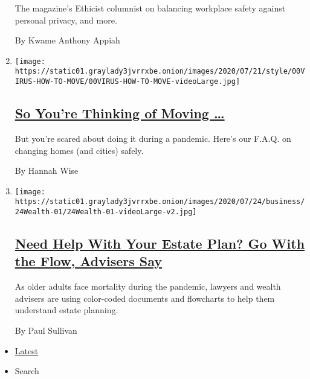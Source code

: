 \begin{enumerate}
  The magazine's Ethicist columnist on balancing workplace safety
  against personal privacy, and more.

  By Kwame Anthony Appiah
\item
  \texttt{[image: https://static01.graylady3jvrrxbe.onion/images/2020/07/21/style/00VIRUS-HOW-TO-MOVE/00VIRUS-HOW-TO-MOVE-videoLarge.jpg]}

  \hypertarget{so-youre-thinking-of-moving-}{%
  \subsection{\texorpdfstring{\href{/2020/07/24/style/moving-during-covid-coronavirus.html}{So
  You're Thinking of Moving
  \ldots{}}}{So You're Thinking of Moving \ldots{}}}\label{so-youre-thinking-of-moving-}}

  But you're scared about doing it during a pandemic. Here's our F.A.Q.
  on changing homes (and cities) safely.

  By Hannah Wise
\item
  \texttt{[image: https://static01.graylady3jvrrxbe.onion/images/2020/07/24/business/24Wealth-01/24Wealth-01-videoLarge-v2.jpg]}

  \hypertarget{need-help-with-your-estate-plan-go-with-the-flow-advisers-say}{%
  \subsection{\texorpdfstring{\href{/2020/07/24/your-money/need-help-with-your-estate-plan-go-with-the-flow-advisers-say.html}{Need
  Help With Your Estate Plan? Go With the Flow, Advisers
  Say}}{Need Help With Your Estate Plan? Go With the Flow, Advisers Say}}\label{need-help-with-your-estate-plan-go-with-the-flow-advisers-say}}

  As older adults face mortality during the pandemic, lawyers and wealth
  advisers are using color-coded documents and flowcharts to help them
  understand estate planning.

  By Paul Sullivan
\end{enumerate}

\begin{itemize}
\tightlist
\item
  \protect\hyperlink{stream-panel}{Latest}
\item
  Search
\end{itemize}

